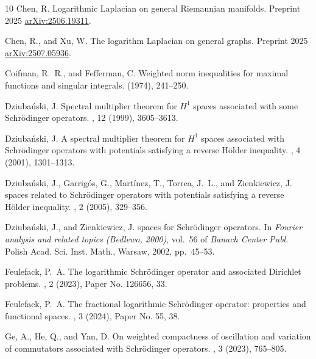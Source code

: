 \documentclass[10pt, a4paper, reqno]{amsart}
\theoremstyle{definition}
\theoremstyle{remark}
\numberwithin{equation}{section}
\begin{document}
\begin{thebibliography}{10}
{\sc Chen, R.}
\newblock Logarithmic {L}aplacian on general {R}iemannian manifolds.
\newblock Preprint 2025 \href{https://arxiv.org/abs/2506.19311}{arXiv:2506.19311}.

{\sc Chen, R., and Xu, W.}
\newblock The logarithm {L}aplacian on general graphs.
\newblock Preprint 2025 \href{https://arxiv.org/abs/2507.05936}{arXiv:2507.05936}.

{\sc Coifman, R.~R., and Fefferman, C.}
\newblock Weighted norm inequalities for maximal functions and singular integrals.
 (1974), 241--250.

{\sc Dziuba\'nski, J.}
\newblock Spectral multiplier theorem for {$H^1$} spaces associated with some {S}chr\"odinger operators.
, 12 (1999), 3605--3613.

{\sc Dziuba\'nski, J.}
\newblock A spectral multiplier theorem for {$H^1$} spaces associated with {S}chr\"odinger operators with potentials satisfying a reverse {H}\"older inequality.
, 4 (2001), 1301--1313.

{\sc Dziuba\'nski, J., Garrig\'os, G., Mart\'inez, T., Torrea, J.~L., and Zienkiewicz, J.}
 spaces related to {S}chr\"odinger operators with potentials satisfying a reverse {H}\"older inequality.
, 2 (2005), 329--356.

{\sc Dziuba\'nski, J., and Zienkiewicz, J.}
 spaces for {S}chr\"odinger operators.
\newblock In {\em Fourier analysis and related topics ({B}edlewo, 2000)}, vol.~56 of {\em Banach Center Publ.} Polish Acad. Sci. Inst. Math., Warsaw, 2002, pp.~45--53.

{\sc Feulefack, P.~A.}
\newblock The logarithmic {S}chr\"odinger operator and associated {D}irichlet problems.
, 2 (2023), Paper No. 126656, 33.

{\sc Feulefack, P.~A.}
\newblock The fractional logarithmic {S}chr\"odinger operator: properties and functional spaces.
, 3 (2024), Paper No. 55, 38.

{\sc Ge, A., He, Q., and Yan, D.}
\newblock On weighted compactness of oscillation and variation of commutators associated with {S}chr\"odinger operators.
, 3 (2023), 765--805.


\end{thebibliography}
\end{document}
